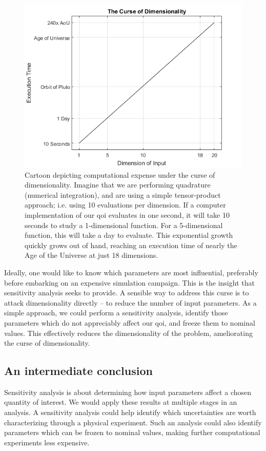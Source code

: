 \documentclass[../primer.tex]{subfiles}
\begin{document}
\begin{figure}[htbp]
\centering
\includegraphics[width=.9\linewidth]{./images/curse_of_dimensionality.png}
\caption{Cartoon depicting computational expense under the curse of dimensionality. Imagine that we are performing quadrature (numerical integration), and are using a simple tensor-product approach; i.e. using 10 evaluations per dimension. If a computer implementation of our qoi evaluates in one second, it will take 10 seconds to study a 1-dimensional function. For a 5-dimensional function, this will take a day to evaluate. This exponential growth quickly grows out of hand, reaching an execution time of nearly the Age of the Universe at just 18 dimensions.}
\end{figure}

Ideally, one would like to know which parameters are most influential,
preferably before embarking on an expensive simulation campaign. This is the
insight that sensitivity analysis seeks to provide. A sensible way to address
this curse is to attack dimensionality directly -- to reduce the number of input
parameters. As a simple approach, we could perform a sensitivity analysis,
identify those parameters which do not appreciably affect our qoi, and freeze
them to nominal values. This effectively reduces the dimensionality of the
problem, ameliorating the curse of dimensionality.

\subsection{An intermediate conclusion}
\label{sec:org6367ab6}
Sensitivity analysis is about determining how input parameters affect a chosen
quantity of interest. We would apply these results at multiple stages in an
analysis. A sensitivity analysis could help identify which uncertainties are
worth characterizing through a physical experiment. Such an analysis could
also identify parameters which can be frozen to nominal values, making further
computational experiments less expensive.
\end{document}
